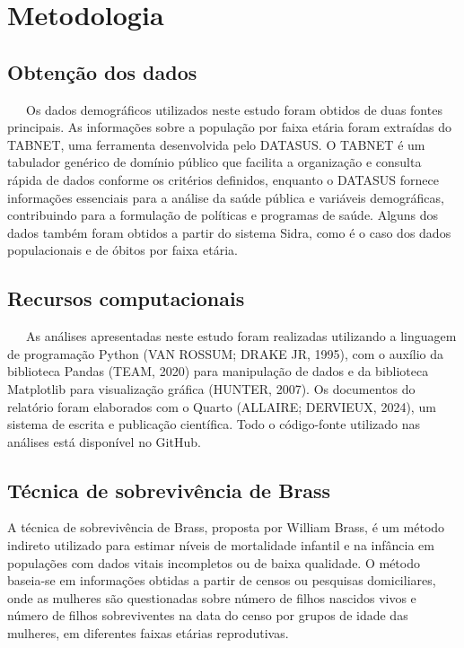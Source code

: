 \documentclass[
  12pt,
  a4paper,
]{scrreprt}
\begin{document}
\chapter{Metodologia}\label{metodologia}

\section{Obtenção dos dados}\label{obtenuxe7uxe3o-dos-dados}

~~~Os dados demográficos utilizados neste estudo foram obtidos de duas
fontes principais. As informações sobre a população por faixa etária
foram extraídas do TABNET, uma ferramenta desenvolvida pelo DATASUS. O
TABNET é um tabulador genérico de domínio público que facilita a
organização e consulta rápida de dados conforme os critérios definidos,
enquanto o DATASUS fornece informações essenciais para a análise da
saúde pública e variáveis demográficas, contribuindo para a formulação
de políticas e programas de saúde. Alguns dos dados também foram obtidos
a partir do sistema Sidra, como é o caso dos dados populacionais e de
óbitos por faixa etária.

\section{Recursos computacionais}\label{recursos-computacionais}

~~~As análises apresentadas neste estudo foram realizadas utilizando a
linguagem de programação Python (VAN ROSSUM; DRAKE JR, 1995), com o
auxílio da biblioteca Pandas (TEAM, 2020) para manipulação de dados e da
biblioteca Matplotlib para visualização gráfica (HUNTER, 2007). Os
documentos do relatório foram elaborados com o Quarto (ALLAIRE;
DERVIEUX, 2024), um sistema de escrita e publicação científica. Todo o
código-fonte utilizado nas análises está disponível no GitHub.

\section{Técnica de sobrevivência de
Brass}\label{tuxe9cnica-de-sobrevivuxeancia-de-brass}

A técnica de sobrevivência de Brass, proposta por William Brass, é um
método indireto utilizado para estimar níveis de mortalidade infantil e
na infância em populações com dados vitais incompletos ou de baixa
qualidade. O método baseia-se em informações obtidas a partir de censos
ou pesquisas domiciliares, onde as mulheres são questionadas sobre
número de filhos nascidos vivos e número de filhos sobreviventes na data
do censo por grupos de idade das mulheres, em diferentes faixas etárias
reprodutivas.
\end{document}
